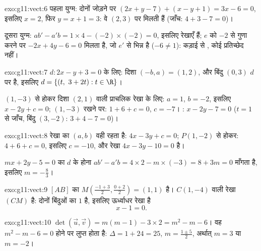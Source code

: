\begin{solution}{exo:g11:vect:6}
पहला युग्म: दोनों  जोड़ने पर $(2x + y - 7) + (x - y + 1) =
3x - 6 = 0$, इसलिए $x = 2$, फिर $y = x + 1 = 3$: वे $(2, 3)$ पर
मिलती हैं (जाँच: $4 + 3 - 7 = 0$)।

दूसरा युग्म: $ab' - a'b = 1 \times 4 - (-2) \times (-2) = 0$, इसलिए रेखाएँ  हैं; $e$ को $-2$ से गुणा करने पर
$-2x + 4y - 6 = 0$ मिलता है, जो $e'$ से भिन्न है ($-6 \neq 1$): कड़ाई से , कोई प्रतिच्छेद
नहीं।
\end{solution}

\begin{solution}{exo:g11:vect:7}
$d: 2x - y + 3 = 0$ के लिए: दिशा $(-b, a) = (1, 2)$, और बिंदु $(0, 3)$ $d$ पर है, इसलिए $d = \{(t,\ 3 + 2t) : t \in \R\}$।

$(1, -3)$ से होकर दिशा $(2, 1)$ वाली प्राचलिक रेखा के लिए: $a = 1$, $b = -2$, इसलिए $x - 2y + c = 0$;
$(1, -3)$ रखने पर: $1 + 6 + c = 0$, $c = -7$। : $x - 2y - 7 = 0$ ($t = 1$ से जाँच, बिंदु $(3, -2)$: $3 + 4 - 7 = 0$)।
\end{solution}

\begin{solution}{exo:g11:vect:8}
 रेखा का $(a, b)$ वही रहता है: $4x - 3y + c = 0$; $P(1, -2)$ से होकर: $4 + 6 + c = 0$, इसलिए $c = -10$, और
रेखा $4x - 3y - 10 = 0$ है।

$mx + 2y - 5 = 0$ का $d$ के  होना $ab' - a'b = 4 \times 2 - m \times (-3) = 8 + 3m = 0$ माँगता है, इसलिए $m = -\frac83$।
\end{solution}

\begin{solution}{exo:g11:vect:9}
$[AB]$ का  $M\!\left(\frac{-1+3}{2}, \frac{0+2}{2}\right)
= (1, 1)$ है।  $C(1, -4)$ वाली रेखा $(CM)$ है: दोनों
बिंदुओं का  $1$ है, इसलिए  ऊर्ध्वाधर रेखा है
\[
x - 1 = 0 .
\]
\end{solution}

\begin{solution}{exo:g11:vect:10}
$\det(\vec u, \vec v) = m(m - 1) - 3 \times 2 = m^2 - m - 6$। वह $m^2 - m - 6 = 0$ होने पर लुप्त होता है: $\Delta = 1 + 24 = 25$,  $m = \frac{1 \pm 5}{2}$, अर्थात् $m = 3$ या
$m = -2$।
\end{solution}

